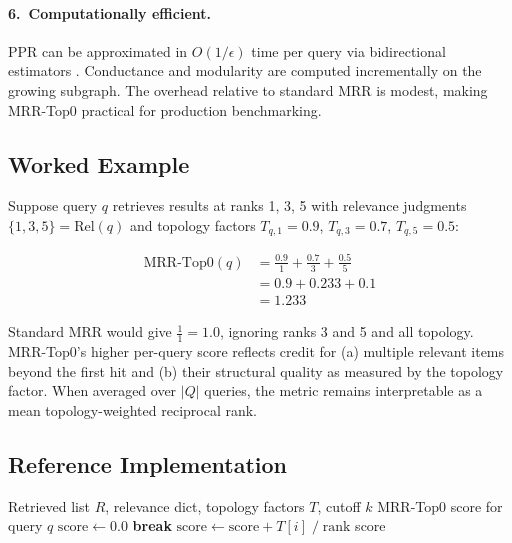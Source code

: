 \documentclass[11pt,a4paper]{article}
\begin{document}
\paragraph{6.\ Computationally efficient.}
PPR can be approximated in $O(1/\epsilon)$ time per query via
bidirectional estimators \cite{stanford_ppr}.  Conductance and modularity
are computed incrementally on the growing subgraph.  The overhead relative
to standard MRR is modest, making MRR-Top0 practical for production
benchmarking.

\subsection{Worked Example}

Suppose query $q$ retrieves results at ranks 1, 3, 5 with relevance
judgments $\{1, 3, 5\} = \mathrm{Rel}(q)$ and topology factors
$T_{q,1} = 0.9$, $T_{q,3} = 0.7$, $T_{q,5} = 0.5$:

\begin{align}
  \mathrm{MRR\text{-}Top0}(q)
  &= \frac{0.9}{1} + \frac{0.7}{3} + \frac{0.5}{5} \nonumber \\
  &= 0.9 + 0.233 + 0.1 \nonumber \\
  &= 1.233 \label{eq:example}
\end{align}

Standard MRR would give $\frac{1}{1} = 1.0$, ignoring ranks 3 and 5
and all topology.  MRR-Top0's higher per-query score reflects credit for
(a) multiple relevant items beyond the first hit and (b) their structural
quality as measured by the topology factor.  When averaged over $|Q|$
queries, the metric remains interpretable as a mean topology-weighted
reciprocal rank.

\subsection{Reference Implementation}

\begin{algorithm}[H]
\caption{MRR-Top0 for a single query}
\label{alg:mrrtop0}
\begin{algorithmic}[1]
\Require Retrieved list $R$, relevance dict, topology factors $T$, cutoff $k$
\Ensure MRR-Top0 score for query $q$
\State $\text{score} \gets 0.0$
   \textbf{break} \EndIf
    \State $\text{score} \gets \text{score} + T[i] \;/\; \text{rank}$
  \EndIf
\EndFor
\State \Return score
\end{algorithmic}
\end{algorithm}
\end{document}
